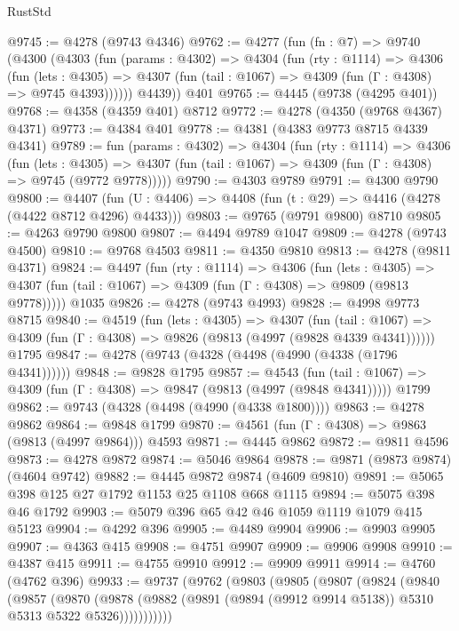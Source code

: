 \begin{lexlean}{RustStd}
\begin{coremodule}
@9745 := @4278 (@9743 @4346)
@9762 := @4277
    (fun (fn : @7) =>
    @9740
      (@4300
        (@4303
          (fun (params : @4302) =>
          @4304
            (fun (rty : @1114) =>
            @4306
              (fun (lets : @4305) =>
              @4307 (fun (tail : @1067) => @4309 (fun (Γ : @4308) => @9745 @4393))))))
        @4439))
    @401
@9765 := @4445 (@9738 (@4295 @401))
@9768 := @4358 (@4359 @401) @8712
@9772 := @4278 (@4350 (@9768 @4367) @4371)
@9773 := @4384 @401
@9778 := @4381 (@4383 @9773 @8715 @4339 @4341)
@9789 := fun (params : @4302) =>
  @4304
    (fun (rty : @1114) =>
    @4306
      (fun (lets : @4305) =>
      @4307 (fun (tail : @1067) => @4309 (fun (Γ : @4308) => @9745 (@9772 @9778)))))
@9790 := @4303 @9789
@9791 := @4300 @9790
@9800 := @4407 (fun (U : @4406) => @4408 (fun (t : @29) => @4416 (@4278 (@4422 @8712 @4296) @4433)))
@9803 := @9765 (@9791 @9800) @8710
@9805 := @4263 @9790 @9800
@9807 := @4494 @9789 @1047
@9809 := @4278 (@9743 @4500)
@9810 := @9768 @4503
@9811 := @4350 @9810
@9813 := @4278 (@9811 @4371)
@9824 := @4497
    (fun (rty : @1114) =>
    @4306
      (fun (lets : @4305) =>
      @4307 (fun (tail : @1067) => @4309 (fun (Γ : @4308) => @9809 (@9813 @9778)))))
    @1035
@9826 := @4278 (@9743 @4993)
@9828 := @4998 @9773 @8715
@9840 := @4519
    (fun (lets : @4305) =>
    @4307
      (fun (tail : @1067) => @4309 (fun (Γ : @4308) => @9826 (@9813 (@4997 (@9828 @4339 @4341))))))
    @1795
@9847 := @4278 (@9743 (@4328 (@4498 (@4990 (@4338 (@1796 @4341))))))
@9848 := @9828 @1795
@9857 := @4543
    (fun (tail : @1067) => @4309 (fun (Γ : @4308) => @9847 (@9813 (@4997 (@9848 @4341)))))
    @1799
@9862 := @9743 (@4328 (@4498 (@4990 (@4338 @1800))))
@9863 := @4278 @9862
@9864 := @9848 @1799
@9870 := @4561 (fun (Γ : @4308) => @9863 (@9813 (@4997 @9864))) @4593
@9871 := @4445 @9862
@9872 := @9811 @4596
@9873 := @4278 @9872
@9874 := @5046 @9864
@9878 := @9871 (@9873 @9874) (@4604 @9742)
@9882 := @4445 @9872 @9874 (@4609 @9810)
@9891 := @5065 @398 @125 @27 @1792 @1153 @25 @1108 @668 @1115
@9894 := @5075 @398 @46 @1792
@9903 := @5079 @396 @65 @42 @46 @1059 @1119 @1079 @415 @5123
@9904 := @4292 @396
@9905 := @4489 @9904
@9906 := @9903 @9905
@9907 := @4363 @415
@9908 := @4751 @9907
@9909 := @9906 @9908
@9910 := @4387 @415
@9911 := @4755 @9910
@9912 := @9909 @9911
@9914 := @4760 (@4762 @396)
@9933 := @9737
    (@9762
      (@9803
        (@9805
          (@9807
            (@9824
              (@9840
                (@9857
                  (@9870
                    (@9878
                      (@9882 (@9891 (@9894 (@9912 @9914 @5138)) @5310 @5313 @5322 @5326)))))))))))

\end{coremodule}
\end{lexlean}

